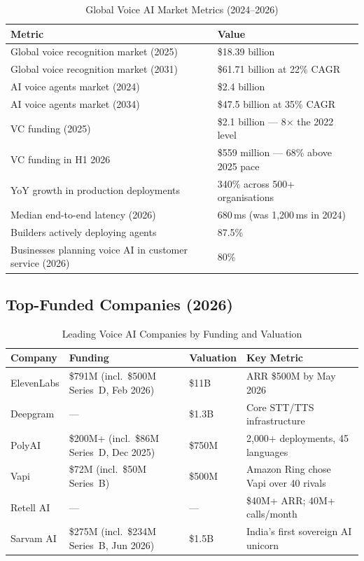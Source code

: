\documentclass[12pt,a4paper]{article}
\begin{document}
\begin{table}[H]\centering
\caption{Global Voice AI Market Metrics (2024--2026)}
\label{tab:market-metrics}
\begin{tabularx}{\textwidth}{lX}
\toprule
\textbf{Metric} & \textbf{Value} \\
\midrule
Global voice recognition market (2025) & \$18.39 billion \\
Global voice recognition market (2031) & \$61.71 billion at 22\% CAGR \\
AI voice agents market (2024) & \$2.4 billion \\
AI voice agents market (2034) & \$47.5 billion at 35\% CAGR \\
VC funding (2025) & \$2.1 billion --- 8$\times$ the 2022 level \\
VC funding in H1 2026 & \$559 million --- 68\% above 2025 pace \\
YoY growth in production deployments & 340\% across 500+ organisations \\
Median end-to-end latency (2026) & 680\,ms (was 1{,}200\,ms in 2024) \\
Builders actively deploying agents & 87.5\% \\
Businesses planning voice AI in customer service (2026) & 80\% \\
\bottomrule
\end{tabularx}
\end{table}

\subsection{Top-Funded Companies (2026)}

\begin{table}[H]\centering
\caption{Leading Voice AI Companies by Funding and Valuation}
\label{tab:top-companies}
\small
\begin{tabularx}{\textwidth}{L{2.6cm}L{4.0cm}L{1.6cm}X}
\toprule
\textbf{Company} & \textbf{Funding} & \textbf{Valuation} & \textbf{Key Metric} \\
\midrule
ElevenLabs & \$791M (incl.\ \$500M Series~D, Feb 2026) & \$11B & ARR \$500M by May 2026 \\
Deepgram   & ---                                        & \$1.3B & Core STT/TTS infrastructure \\
PolyAI     & \$200M+ (incl.\ \$86M Series~D, Dec 2025) & \$750M & 2{,}000+ deployments, 45 languages \\
Vapi       & \$72M (incl.\ \$50M Series~B)             & \$500M & Amazon Ring chose Vapi over 40 rivals \\
Retell AI  & ---                                        & ---    & \$40M+ ARR; 40M+ calls/month \\
Sarvam AI  & \$275M (incl.\ \$234M Series~B, Jun 2026) & \$1.5B & India's first sovereign AI unicorn \\
\bottomrule
\end{tabularx}
\end{table}
\end{document}
